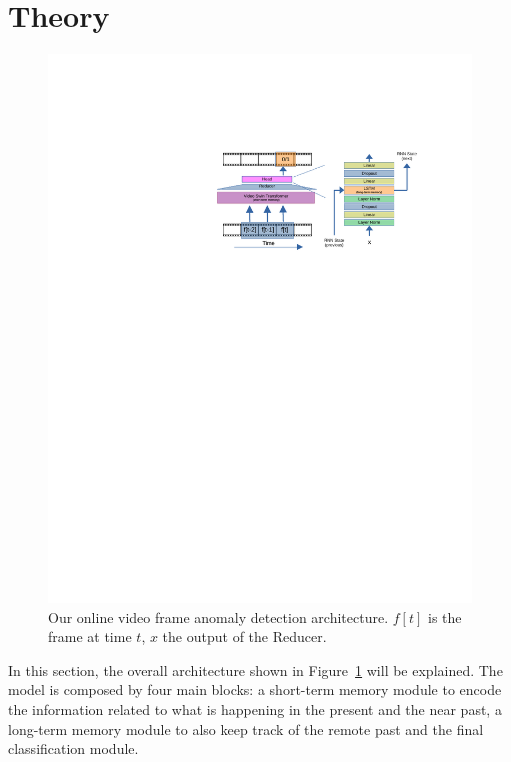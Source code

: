 \section{Theory}
\label{sec:theory}

\fboxsep=1mm%
\fboxrule=1pt%

\begin{figure}[!ht]
	\centering
            \includegraphics[trim=205 500 80 130, clip, width=1.\linewidth]{images/arch.pdf}
        \caption{Our online video frame anomaly detection architecture. $f[t]$ is the frame at time $t$, $x$ the output of the Reducer.}
		\label{fig:arch}
\end{figure}

In this section, the overall architecture shown in Figure~\ref{fig:arch} will be explained.
The model is composed by four main blocks: a short-term memory module to encode the information related to what is happening in the present and the near past, a long-term memory module to also keep track of the remote past and the final classification module. 

